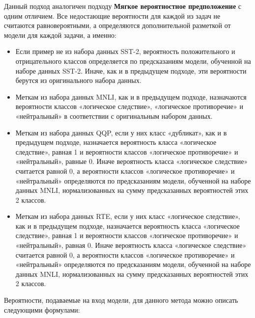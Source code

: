 Данный подход аналогичен подходу \textbf{Мягкое вероятностное предположение} с одним отличием. Все недостающие вероятности для каждой из задач не считаются равновероятными, а определяются дополнительной разметкой от модели для каждой задачи, а именно:
\begin{itemize}
\item Если пример не из набора данных SST-2, вероятность положительного и отрицательного классов определяется по предсказаниям модели, обученной на наборе данных SST-2. Иначе, как и в предыдущем подходе, эти вероятности берутся из оригинального набора данных.
\item Меткам из набора данных MNLI, как и в предыдущем подходе, назначаются вероятности классов «логическое следствие», «логическое противоречие» и «нейтральный» в соответствии с оригинальным набором данных.
\item Меткам из набора данных QQP, если у них класс «дубликат», как и в предыдущем подходе, назначается вероятность класса «логическое следствие», равная 1 и вероятности классов «логическое противоречие» и «нейтральный», равные 0. Иначе вероятность класса «логическое следствие» считается равной 0, а вероятности классов «логическое противоречие» и «нейтральный» определяются по предсказаниям модели, обученной на наборе данных MNLI, нормализованных на сумму предсказанных вероятностей этих 2 классов.
\item Меткам из набора данных RTE, если у них класс «логическое следствие», как и в предыдущем подходе, назначается вероятность класса «логическое следствие», равная 1 и вероятности классов «логическое противоречие» и «нейтральный», равная 0.  Иначе вероятность класса «логическое следствие» считается равной 0, а вероятности классов «логическое противоречие» и «нейтральный» определяются по предсказаниям модели, обученной на наборе данных MNLI, нормализованных на сумму предсказанных вероятностей этих 2 классов.
\end{itemize}


Вероятности, подаваемые на вход модели, для данного метода можно описать следующими формулами:




